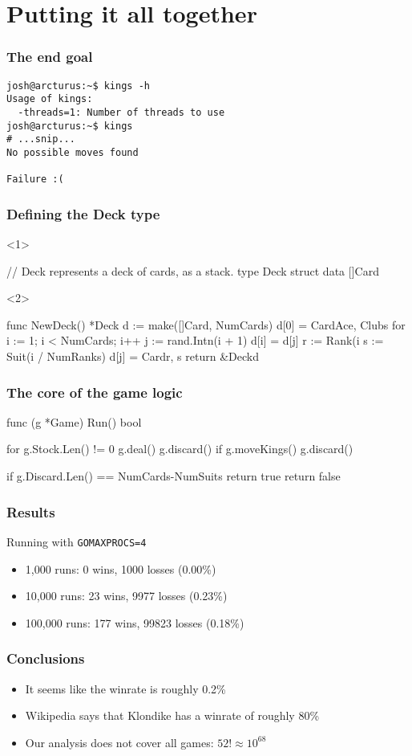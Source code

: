 \documentclass{beamer}
\begin{document}
\section{Putting it all together}

\begin{frame}[fragile]
\frametitle{The end goal}
\begin{verbatim}
josh@arcturus:~$ kings -h
Usage of kings:
  -threads=1: Number of threads to use
josh@arcturus:~$ kings
# ...snip...
No possible moves found

Failure :(
\end{verbatim}
\end{frame}

\begin{frame}[fragile]
\frametitle{Defining the Deck type}
\begin{onlyenv}<1>
\begin{gocode}
// Deck represents a deck of cards, as a stack.
type Deck struct {
        data []Card
}
\end{gocode}
\end{onlyenv}
\begin{onlyenv}<2>
\begin{gocode}
func NewDeck() *Deck {
        d := make([]Card, NumCards)
        d[0] = Card{Ace, Clubs}
        for i := 1; i < NumCards; i++ {
                j := rand.Intn(i + 1)
                d[i] = d[j]
                r := Rank(i%
                s := Suit(i / NumRanks)
                d[j] = Card{r, s}
        }
        return &Deck{d}
}

\end{gocode}
\end{onlyenv}
\end{frame}

\begin{frame}[fragile]
\frametitle{The core of the game logic}
\begin{gocode}
func (g *Game) Run() bool {
        for g.Stock.Len() != 0 {
                g.deal()
                g.discard()
                if g.moveKings() {
                        g.discard()
                }
        }

        if g.Discard.Len() == NumCards-NumSuits {
                return true
        }
        return false
}
\end{gocode}
\end{frame}

\begin{frame}
\frametitle{Results}
Running with \texttt{GOMAXPROCS=4}
\begin{itemize}
\item 1,000 runs: 0 wins, 1000 losses (0.00\%)
\item 10,000 runs: 23 wins, 9977 losses (0.23\%)
\item 100,000 runs: 177 wins, 99823 losses (0.18\%)
\end{itemize}
\end{frame}

\begin{frame}
\frametitle{Conclusions}
\begin{itemize}
\item It seems like the winrate is roughly 0.2\%
\item Wikipedia says that Klondike has a winrate of roughly 80\%
\item Our analysis does not cover all games: $52! \approx 10^68$
\end{itemize}
\end{frame}
\end{document}
